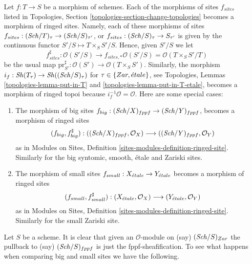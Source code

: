 \begin{remark}
\label{remark-change-topologies-ringed}
Let $f : T \to S$ be a morphism of schemes.
Each of the morphisms of sites $f_{sites}$ listed in
Topologies, Section \ref{topologies-section-change-topologies}
becomes a morphism of ringed sites. Namely, each of these morphisms of sites
$f_{sites} : (\mathit{Sch}/T)_\tau \to (\mathit{Sch}/S)_{\tau'}$, or
$f_{sites} : (\mathit{Sch}/S)_\tau \to S_{\tau'}$ is given by the continuous
functor $S'/S \mapsto T \times_S S'/S$. Hence, given $S'/S$ we let
$$
f_{sites}^\sharp :
\mathcal{O}(S'/S)
\longrightarrow
f_{sites, *}\mathcal{O}(S'/S) =
\mathcal{O}(T \times_S S'/T)
$$
be the usual map
$\text{pr}_{S'}^\sharp : \mathcal{O}(S') \to \mathcal{O}(T \times_S S')$.
Similarly, the morphism
$i_f : \mathop{\mathit{Sh}}\nolimits(T_\tau) \to \mathop{\mathit{Sh}}\nolimits((\mathit{Sch}/S)_\tau)$
for $\tau \in \{Zar, {\acute{e}tale}\}$, see
Topologies, Lemmas \ref{topologies-lemma-put-in-T} and
\ref{topologies-lemma-put-in-T-etale},
becomes a morphism of ringed topoi because $i_f^{-1}\mathcal{O} = \mathcal{O}$.
Here are some special cases:
\begin{enumerate}
\item The morphism of big sites
$f_{big} : (\mathit{Sch}/X)_{fppf} \to (\mathit{Sch}/Y)_{fppf}$,
becomes a morphism of ringed sites
$$
(f_{big}, f_{big}^\sharp) :
((\mathit{Sch}/X)_{fppf}, \mathcal{O}_X)
\longrightarrow
((\mathit{Sch}/Y)_{fppf}, \mathcal{O}_Y)
$$
as in Modules on Sites, Definition \ref{sites-modules-definition-ringed-site}.
Similarly for the big syntomic, smooth, \'etale and Zariski sites.
\item The morphism of small sites
$f_{small} : X_{\acute{e}tale} \to Y_{\acute{e}tale}$
becomes a morphism of ringed sites
$$
(f_{small}, f_{small}^\sharp) :
(X_{\acute{e}tale}, \mathcal{O}_X)
\longrightarrow
(Y_{\acute{e}tale}, \mathcal{O}_Y)
$$
as in Modules on Sites, Definition \ref{sites-modules-definition-ringed-site}.
Similarly for the small Zariski site.
\end{enumerate}
\end{remark}

\noindent
Let $S$ be a scheme. It is clear that given an $\mathcal{O}$-module on (say)
$(\mathit{Sch}/S)_{Zar}$ the pullback to (say) $(\mathit{Sch}/S)_{fppf}$
is just the fppf-sheafification. To see what happens when comparing
big and small sites we have the following.

